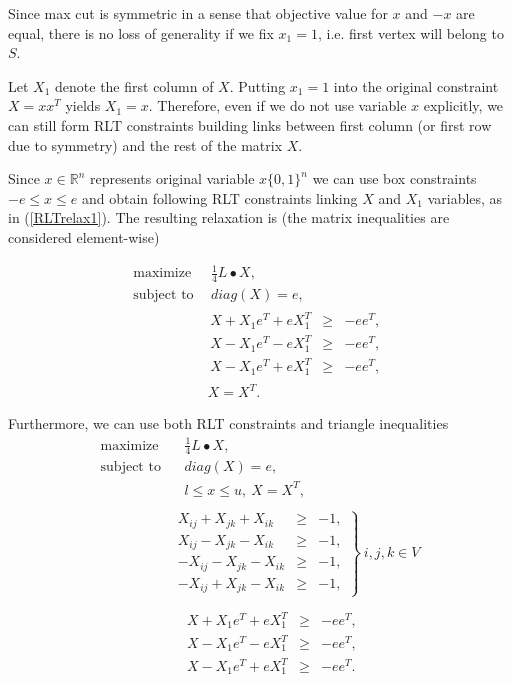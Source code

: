 \documentclass[12pt]{book}
\theoremstyle{definition}
\begin{document}
Since max cut is symmetric in a sense that objective value for $x$ and $-x$ are equal, there is no loss of generality if we fix $x_1 = 1$, i.e. first vertex will belong to $S$. 

Let $X_1$ denote the first column of $X$. Putting $x_1 = 1$ into the original constraint $X = xx^T$ yields $X_1 = x$.
Therefore, even if we do not use variable $x$ explicitly, we can still form RLT constraints building links between first column (or first row due to symmetry) and the rest of the matrix $X$.


Since $x\in \mathbb{R}^n$ represents original variable $x\{0,1\}^n$ we can use box constraints 
$-e \leq x \leq e$
and obtain following RLT constraints linking $X$ and $X_1$ variables, as in (\ref{RLTrelax1}).
The resulting relaxation is (the matrix inequalities are considered element-wise)


\begin{equation}
\label{MaxCutLPRelaxRLT}
\begin{array}{ll}
\mbox{maximize} & \ \ \frac{1}{4}L\bullet X, \\
\mbox{subject to} & \ \ diag(X) = e , \\
		& \begin{array}{lcl}
		 X + X_1e^T + eX_1^T & \geq & -ee^T, \\
		 X - X_1e^T - eX_1^T & \geq & -ee^T, \\
		 X - X_1e^T + eX_1^T & \geq & -ee^T,
	\end{array}\\
 		&\  X=X^T.
\end{array}
\end{equation} 

Furthermore, we can use both RLT constraints and triangle inequalities
\begin{equation}
\label{MaxCutLPRelaxRLT+triangle}
\begin{array}{ll}
\mbox{maximize} & \ \ \ \ \frac{1}{4}L\bullet X, \\
\mbox{subject to} & \ \ \ \ diag(X) = e ,\\
& \ \ \ \ l\leq x \leq u,\ X=X^T, \\
& \\
& \left.\begin{array}{rcl}
X_{ij} + X_{jk} + X_{ik} &\geq & -1, \\
X_{ij} - X_{jk} - X_{ik} &\geq & -1, \\
- X_{ij} - X_{jk} - X_{ik} &\geq & -1, \\
- X_{ij} + X_{jk} - X_{ik} &\geq & -1,
\end{array}\right\rbrace \ i,j,k \in V \\
& \\
		& \ \ \ \begin{array}{lcl}
		 X + X_1e^T + eX_1^T & \geq & -ee^T, \\
		 X - X_1e^T - eX_1^T & \geq & -ee^T, \\
		 X - X_1e^T + eX_1^T & \geq & -ee^T.
	\end{array}
\end{array}
\end{equation} 
\end{document}
